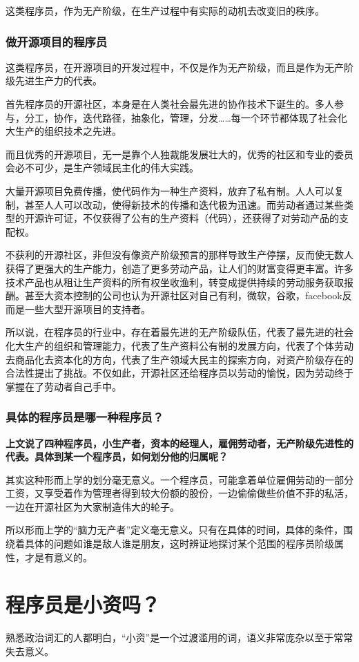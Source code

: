 \documentclass[punct=kaiming, zihao=5, openany, fontset=sikou]{ctexbook}
\begin{document}
这类程序员，作为无产阶级，在生产过程中有实际的动机去改变旧的秩序。

\subsubsection{做开源项目的程序员}
这类程序员，在开源项目的开发过程中，不仅是作为无产阶级，而且是作为无产阶级先进生产力的代表。

首先程序员的开源社区，本身是在人类社会最先进的协作技术下诞生的。多人参与，分工，协作，迭代路径，抽象化，管理，分发……每一个环节都体现了社会化大生产的组织技术之先进。

而且优秀的开源项目，无一是靠个人独裁能发展壮大的，优秀的社区和专业的委员会必不可少，是生产领域民主化的伟大实践。

大量开源项目免费传播，使代码作为一种生产资料，放弃了私有制。人人可以复制，甚至人人可以改动，使得新技术的传播和迭代极为迅速。而劳动者通过某些类型的开源许可证，不仅获得了公有的生产资料（代码），还获得了对劳动产品的支配权。

不获利的开源社区，非但没有像资产阶级预言的那样导致生产停摆，反而使无数人获得了更强大的生产能力，创造了更多劳动产品，让人们的财富变得更丰富。许多技术产品也从租让生产资料的所有权坐收渔利，转变成提供持续的劳动服务获取报酬。甚至大资本控制的公司也认为开源社区对自己有利，微软，谷歌，facebook反而是一些大型开源项目的支持者。

所以说，在程序员的行业中，存在着最先进的无产阶级队伍，代表了最先进的社会化大生产的组织和管理能力，代表了生产资料公有制的发展方向，代表了个体劳动去商品化去资本化的方向，代表了生产领域大民主的探索方向，对资产阶级存在的合法性提出了挑战。不仅如此，开源社区还给程序员以劳动的愉悦，因为劳动终于掌握在了劳动者自己手中。

\subsubsection{具体的程序员是哪一种程序员？}
{\bfseries 上文说了四种程序员，小生产者，资本的经理人，雇佣劳动者，无产阶级先进性的代表。具体到某一个程序员，如何划分他的归属呢？

其实这种形而上学的划分毫无意义。一个程序员，可能拿着单位雇佣劳动的一部分工资，又享受着作为管理者得到较大份额的股份，一边偷偷做些价值不菲的私活，一边在开源社区为大家制造伟大的轮子。}

所以形而上学的“脑力无产者”定义毫无意义。只有在具体的时间，具体的条件，围绕着具体的问题如谁是敌人谁是朋友，这时辨证地探讨某个范围的程序员阶级属性，才是有意义的。

\section{程序员是小资吗？}
熟悉政治词汇的人都明白，“小资”是一个过渡滥用的词，语义非常庞杂以至于常常失去意义。
\end{document}
